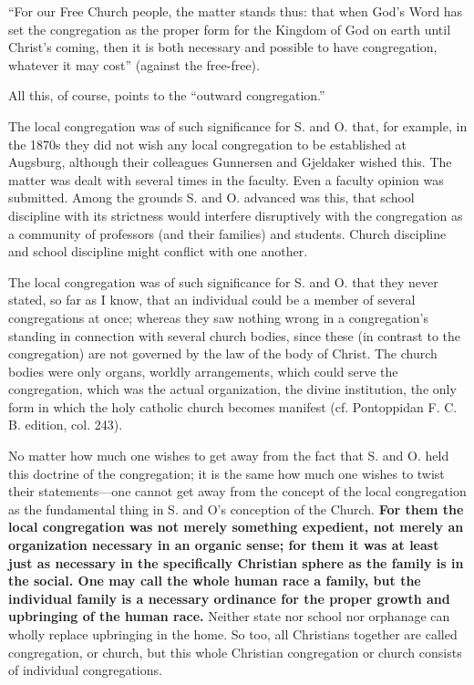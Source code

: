 “For our Free Church people, the matter stands thus: that when God’s Word has set the congregation as the proper form for the Kingdom of God on earth until Christ’s coming, then it is both necessary and possible to have congregation, whatever it may cost” (against the free-free).

All this, of course, points to the “outward congregation.”

The local congregation was of such significance for S. and O. that, for example, in the 1870s they did not wish any local congregation to be established at Augsburg, although their colleagues Gunnersen and Gjeldaker wished this. The matter was dealt with several times in the faculty. Even a faculty opinion was submitted. Among the grounds S. and O. advanced was this, that school discipline with its strictness would interfere disruptively with the congregation as a community of professors (and their families) and students. Church discipline and school discipline might conflict with one another.

The local congregation was of such significance for S. and O. that they never stated, so far as I know, that an individual could be a member of several congregations at once; whereas they saw nothing wrong in a congregation’s standing in connection with several church bodies, since these (in contrast to the congregation) are not governed by the law of the body of Christ. The church bodies were only organs, worldly arrangements, which could serve the congregation, which was the actual organization, the divine institution, the only form in which the holy catholic church becomes manifest (cf. Pontoppidan F. C. B. edition, col. 243).

No matter how much one wishes to get away from the fact that S. and O. held this doctrine of the congregation; it is the same how much one wishes to twist their statements—one cannot get away from the concept of the local congregation as the fundamental thing in S. and O’s conception of the Church. \textbf{For them the local congregation was not merely something expedient, not merely an organization necessary in an organic sense; for them it was at least just as necessary in the specifically Christian sphere as the family is in the social. One may call the whole human race a family, but the individual family is a necessary ordinance for the proper growth and upbringing of the human race.}  Neither state nor school nor orphanage can wholly replace upbringing in the home. So too, all Christians together are called congregation, or church, but this whole Christian congregation or church consists of individual congregations.



